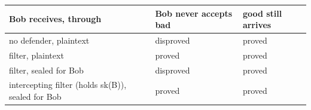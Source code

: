\begin{tabular}{p{}ll}
\toprule
Bob receives, through & Bob never accepts bad & good still arrives \\
\midrule
no defender, plaintext & disproved & proved \\
filter, plaintext & proved & proved \\
filter, sealed for Bob & disproved & proved \\
intercepting filter (holds sk(B)), sealed for Bob & proved & proved \\
\bottomrule
\end{tabular}
